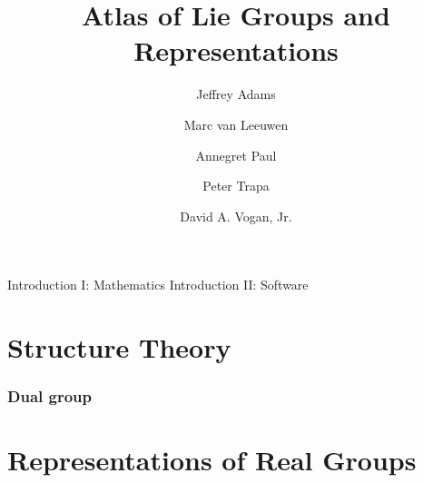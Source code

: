 \documentclass[letterpaper,10pt,oneside,onecolumn,openright,final]{amsbook}
\theoremstyle{definition}
\theoremstyle{remark}
\numberwithin{section}{chapter}
\numberwithin{equation}{chapter}
\begin{document}
\title{Atlas of Lie Groups and Representations}
\author{Jeffrey Adams}
\author{Marc van Leeuwen}
\author{Annegret Paul}
\author{Peter Trapa}
\author{David A. Vogan, Jr.}

\frontmatter                            %
\maketitle                              %
\tableofcontents                        %
\mainmatter                             %
\backmatter
\maketitle


{Introduction I: Mathematics}%
{Introduction II: Software}%

\part{Structure Theory}
\label{p:structure}
\section{Dual group}
\part{Representations of Real Groups}
\end{document}
